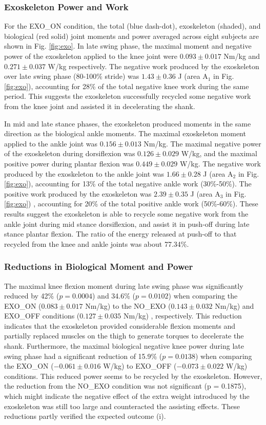 \documentclass[10pt]{asme2ej}
\begin{document}
\subsubsection{Exoskeleton Power and Work}
For the EXO\_ON condition, the total (blue dash-dot), exoskeleton (shaded), and biological (red solid) joint moments and power averaged across eight subjects are shown in Fig. \ref{fig:exo}.
In late swing phase, the maximal moment and negative power of the exoskeleton applied to the knee joint were $0.093\pm0.017$ Nm/kg and $0.271\pm0.037$ W/kg respectively.
The negative work produced by the exoskeleton over late swing phase (80-100\% stride) was $1.43\pm0.36$ J (area A$_{1}$ in Fig. \ref{fig:exo}), accounting for 28\% of the total negative knee work during the same period.
This suggests the exoskeleton successfully recycled some negative work from the knee joint and assisted it in decelerating the shank.

In mid and late stance phases, the exoskeleton produced moments in the same direction as the biological ankle moments.
The maximal exoskeleton moment applied to the ankle joint was $0.156\pm0.013$ Nm/kg.
The maximal negative power of the exoskeleton during dorsiflexion was $0.126\pm0.029$ W/kg, and the maximal positive power during plantar flexion was $0.449\pm0.029$ W/kg.
The negative work produced by the exoskeleton to the ankle joint was $1.66\pm0.28$ J (area A$_{2}$ in Fig. \ref{fig:exo}), accounting for 13\% of the total negative ankle work (30\%-50\%).
The positive work produced by the exoskeleton was $2.39\pm0.35$ J (area A$_{3}$ in Fig. \ref{fig:exo}) , accounting for 20\% of the total positive ankle work (50\%-60\%).
These results suggest the exoskeleton is able to recycle some negative work from the ankle joint during mid stance dorsiflexion, and assist it in push-off during late stance plantar flexion.
The ratio of the energy released at push-off to that recycled from the knee and ankle joints was about 77.34\%.

\subsubsection{Reductions in Biological Moment and Power}
The maximal knee flexion moment during late swing phase was significantly reduced by 42\% ($p = 0.0004$) and 34.6\% ($p = 0.0102$) when comparing the EXO\_ON ($0.083\pm0.017$ Nm/kg) to the NO\_EXO ($0.143\pm0.032$ Nm/kg) and EXO\_OFF conditions ($0.127\pm0.035$ Nm/kg) , respectively.
This reduction indicates that the exoskeleton provided considerable flexion moments and partially replaced muscles on the thigh to generate torques to decelerate the shank.
Furthermore, the maximal biological negative knee power during late swing phase had a significant reduction of 15.9\% ($p = 0.0138$) when comparing the EXO\_ON ($-0.061\pm0.016$ W/kg) to EXO\_OFF ($-0.073\pm0.022$ W/kg) conditions.
This reduced power seems to be recycled by the exoskeleton. However, the reduction from the NO\_EXO condition was not significant (p = 0.1875), which might indicate the negative effect of the extra weight introduced by the exoskeleton was still too large and counteracted the assisting effects.
These reductions partly verified the expected outcome (i).
\end{document}
